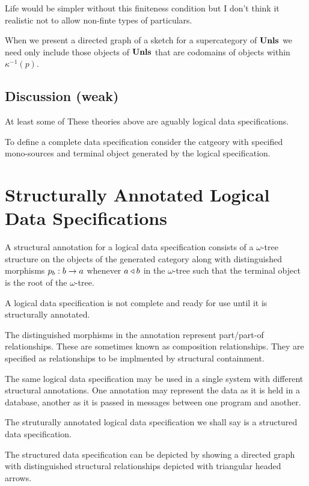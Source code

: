 \documentclass[10pt,a4paper]{article}
\theoremstyle{remark}
\begin{document}
Life would be simpler without this finiteness condition but I don't think it realistic not to allow non-finte types of particulars.

When we present a directed graph of a sketch for a supercategory of $\textbf{Unls}$ we need only include those
objects of $\textbf{Unls}$ that are codomains of objects within  $\kappa^{-1}(p)$.

\begin{oldtt}
\subsection*{Discussion (weak)}
At least some of These theories above are aguably logical data specifications.

To define a complete data specification consider the catgeory with specified mono-sources
and terminal object generated by the logical specification. 
\end{oldtt}


\section{Structurally Annotated Logical Data Specifications}
A structural annotation for a logical data specification consists of a 
$\omega$-tree structure on the objects of the generated category \catcw
along with distinguished morphisms $p_b: b \rightarrow a$ whenever $a \triangleleft b$ in the  $\omega$-tree
such that the terminal object is the root of the $\omega$-tree.

A logical data specification is not complete and ready for use until it is structurally annotated.

The distinguished morphisms in the annotation represent part/part-of relationships. These are sometimes known as composition relationships. They are specified as relationships to be implmented by structural containment.

The same logical data specification may be used in a single system with different structural annotations.
One annotation may represent the data as it is held in a database, another as it is passed in messages between one program and another.

The struturally annotated logical data specification we shall say is a structured data specification.

The structured data specification  can be depicted by showing a directed graph with
distinguished structural relationships depicted with triangular headed arrows.
\end{document}
